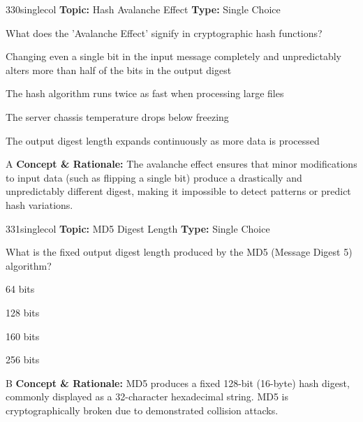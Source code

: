 \begin{qcard}{330}{singlecol}
\textcolor{darkslate!75}{\small\textbf{Topic:} Hash Avalanche Effect \hfill \textbf{Type:} Single Choice}\vspace{0.4em}\par
What does the 'Avalanche Effect' signify in cryptographic hash functions?
\begin{qoptions}
\item Changing even a single bit in the input message completely and unpredictably alters more than half of the bits in the output digest
\item The hash algorithm runs twice as fast when processing large files
\item The server chassis temperature drops below freezing
\item The output digest length expands continuously as more data is processed
\end{qoptions}
\end{qcard}
\nopagebreak
\begin{explainbox}{A}
\textbf{Concept \& Rationale:} The avalanche effect ensures that minor modifications to input data (such as flipping a single bit) produce a drastically and unpredictably different digest, making it impossible to detect patterns or predict hash variations.
\end{explainbox}

\begin{qcard}{331}{singlecol}
\textcolor{darkslate!75}{\small\textbf{Topic:} MD5 Digest Length \hfill \textbf{Type:} Single Choice}\vspace{0.4em}\par
What is the fixed output digest length produced by the MD5 (Message Digest 5) algorithm?
\begin{qoptions}
\item 64 bits
\item 128 bits
\item 160 bits
\item 256 bits
\end{qoptions}
\end{qcard}
\nopagebreak
\begin{explainbox}{B}
\textbf{Concept \& Rationale:} MD5 produces a fixed 128-bit (16-byte) hash digest, commonly displayed as a 32-character hexadecimal string. MD5 is cryptographically broken due to demonstrated collision attacks.
\end{explainbox}

